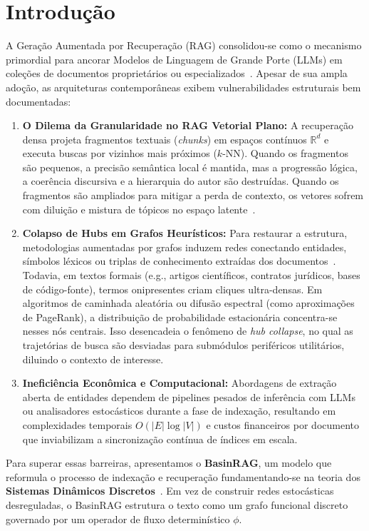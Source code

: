 \documentclass[10pt,twocolumn]{article}
\theoremstyle{definition}
\begin{document}
\section{Introdução}

A Geração Aumentada por Recuperação (RAG) consolidou-se como o mecanismo primordial para ancorar Modelos de Linguagem de Grande Porte (LLMs) em coleções de documentos proprietários ou especializados~\cite{lewis2020retrieval,guu2020realm}. Apesar de sua ampla adoção, as arquiteturas contemporâneas exibem vulnerabilidades estruturais bem documentadas:

\begin{enumerate}
    \item \textbf{O Dilema da Granularidade no RAG Vetorial Plano:} A recuperação densa projeta fragmentos textuais (\textit{chunks}) em espaços contínuos $\mathbb{R}^d$ e executa buscas por vizinhos mais próximos ($k$-NN). Quando os fragmentos são pequenos, a precisão semântica local é mantida, mas a progressão lógica, a coerência discursiva e a hierarquia do autor são destruídas. Quando os fragmentos são ampliados para mitigar a perda de contexto, os vetores sofrem com diluição e mistura de tópicos no espaço latente~\cite{karpukhin2020dense,gao2023modular}.
    \item \textbf{Colapso de Hubs em Grafos Heurísticos:} Para restaurar a estrutura, metodologias aumentadas por grafos induzem redes conectando entidades, símbolos léxicos ou triplas de conhecimento extraídas dos documentos~\cite{pan2024unifying}. Todavia, em textos formais (e.g., artigos científicos, contratos jurídicos, bases de código-fonte), termos onipresentes criam cliques ultra-densas. Em algoritmos de caminhada aleatória ou difusão espectral (como aproximações de PageRank), a distribuição de probabilidade estacionária concentra-se nesses nós centrais. Isso desencadeia o fenômeno de \textit{hub collapse}, no qual as trajetórias de busca são desviadas para submódulos periféricos utilitários, diluindo o contexto de interesse.
    \item \textbf{Ineficiência Econômica e Computacional:} Abordagens de extração aberta de entidades dependem de pipelines pesados de inferência com LLMs ou analisadores estocásticos durante a fase de indexação, resultando em complexidades temporais $O(|E| \log |V|)$ e custos financeiros por documento que inviabilizam a sincronização contínua de índices em escala.
\end{enumerate}

Para superar essas barreiras, apresentamos o \textbf{BasinRAG}, um modelo que reformula o processo de indexação e recuperação fundamentando-se na teoria dos \textbf{Sistemas Dinâmicos Discretos}~\cite{martins2026iterated}. Em vez de construir redes estocásticas desreguladas, o BasinRAG estrutura o texto como um grafo funcional discreto governado por um operador de fluxo determinístico $\phi$.
\end{document}
